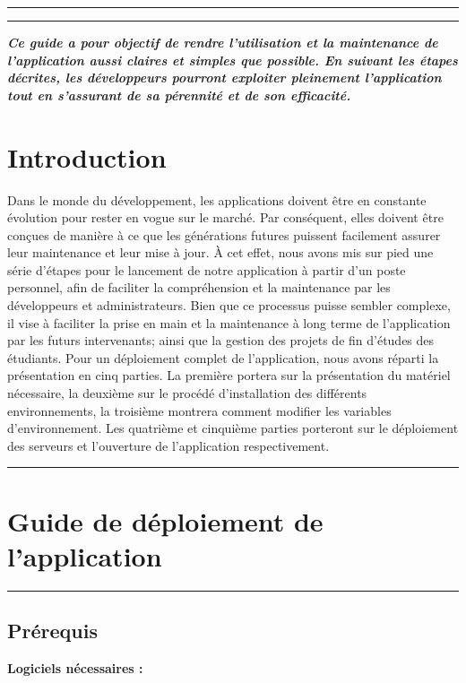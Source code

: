 \rule{\linewidth}{0.2pt}

\vfill
\rule{\linewidth}{0.2pt}
\textbf{\textit{Ce guide a pour objectif de rendre l’utilisation et la maintenance de l’application aussi claires et simples
que possible. En suivant les étapes décrites, les développeurs pourront exploiter pleinement l'application tout en s'assurant de sa 
pérennité et de son efficacité.}}

\newpage

{\fontsize{14}{16}\section*{Introduction}}
Dans le monde du développement, les applications doivent être en constante évolution pour rester en vogue sur le marché. Par conséquent, elles doivent être conçues de manière à ce que les générations futures puissent
facilement assurer leur maintenance et leur mise à jour. À cet effet, nous avons mis sur pied une série d'étapes pour le lancement de notre application
à partir d’un poste personnel, afin de faciliter la compréhension et la maintenance par les
développeurs et administrateurs. Bien que ce processus puisse sembler complexe, il vise à faciliter la prise en main et la
maintenance à long terme de l’application par les futurs intervenants; ainsi que la gestion
des projets de fin d'études des étudiants. Pour un déploiement complet de l'application, nous avons réparti la présentation en cinq
parties. La première portera sur la présentation du matériel nécessaire, la deuxième sur le procédé d'installation des différents environnements, la troisième montrera comment modifier les variables d'environnement. Les quatrième et cinquième parties porteront sur le déploiement des serveurs et l'ouverture de l'application respectivement.

\vspace{0.5cm}
\rule{\linewidth}{0.2pt}

\newpage
{\fontsize{14}{16}\section*{Guide de déploiement de l’application}}
\setcounter{subsection}{0} %
\renewcommand\thesubsection{\arabic{subsection}}
\rule{\linewidth}{0.2pt}
\subsection{Prérequis}
\textbf{Logiciels nécessaires :}

